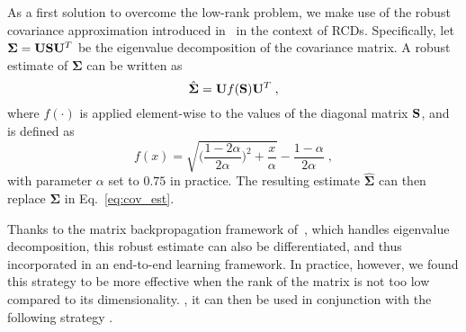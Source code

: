 %

As a first solution to overcome the low-rank problem, we make use of the robust covariance approximation introduced in~\cite{Wang:2016va} in the context of RCDs. Specifically, let $\boldsymbol{\Sigma} = {\bf U}  {\bf S} {\bf U}^T$ be the eigenvalue decomposition of the covariance matrix. A robust estimate of $\boldsymbol{\Sigma}$ can be written as
\begin{equation}
 \hat{ \boldsymbol{\Sigma} } = {\bf U} f({\bf S}) {\bf U}^T\;,
\end{equation}
where $f(\cdot)$ is applied element-wise to the values of the diagonal matrix ${\bf S}$, and is defined as
\begin{equation} \label{eq:robust}
f(x) = \sqrt{\bigg(\frac{1-2\alpha}{2\alpha}\bigg)^2 + \frac{x}{\alpha}} - \frac{1 - \alpha}{2\alpha}\;,
\end{equation}
with parameter $\alpha$ set to $0.75$ in practice. The resulting estimate $\hat{ \boldsymbol{\Sigma} }$ can then replace $\boldsymbol{\Sigma}$ in Eq.~\ref{eq:cov_est}.

Thanks to the matrix backpropagation framework of~\cite{Ionescu:2015wa}, which handles eigenvalue decomposition, this robust estimate can also be differentiated, and thus incorporated in an end-to-end learning framework.
In practice, however, we found this strategy to be more effective when the rank of the matrix is not too low compared to its dimensionality.
, it can then be used in conjunction with the following strategy .

